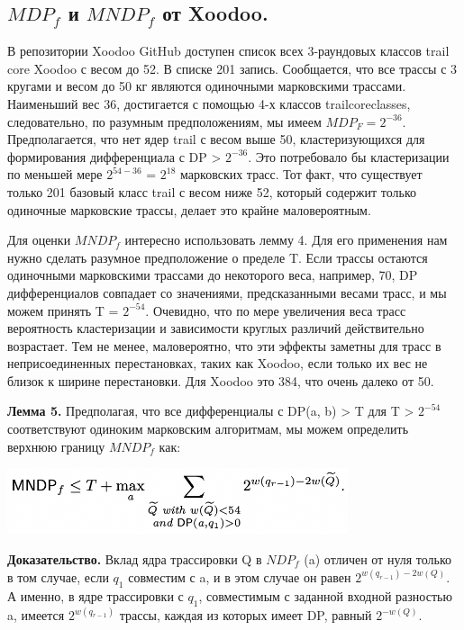 \documentclass[utf8,14pt,a4paper,oneside,russian]{book}
\begin{document}
\subsection{$MDP_f$ и $MNDP_f$ от Xoodoo.}

В репозитории Xoodoo GitHub доступен список всех 3-раундовых классов 
trail core Xoodoo с весом до 52. В списке 201 запись. Сообщается, что 
все трассы с 3 кругами и весом до 50 кг являются одиночными марковскими 
трассами. Наименьший вес 36, достигается с помощью 4-х классов 
trailcoreclasses, следовательно, по разумным предположениям, мы имеем 
$MDP_F =2^{-36}$. Предполагается, что нет ядер trail с весом выше 50, 
кластеризующихся для формирования дифференциала с DP > $2^{-36}$. 
Это потребовало бы кластеризации по меньшей мере $2^{54-36}$ = $2^18$ 
марковских трасс. Тот факт, что существует только 201 базовый класс 
trail с весом ниже 52, который содержит только одиночные марковские 
трассы, делает это крайне маловероятным.

Для оценки $MNDP_f$ интересно использовать лемму 4. Для его применения 
нам нужно сделать разумное предположение о пределе T. Если трассы остаются 
одиночными марковскими трассами до некоторого веса, например, 70, DP 
дифференциалов совпадает со значениями, предсказанными весами трасс, и мы 
можем принять T = $2^{-54}$. Очевидно, что по мере увеличения веса 
трасс вероятность кластеризации и зависимости круглых различий действительно 
возрастает. Тем не менее, маловероятно, что эти эффекты заметны для трасс 
в неприсоединенных перестановках, таких как Xoodoo, если только их вес не 
близок к ширине перестановки. Для Xoodoo это 384, что очень далеко от 50.

\newpage
\textbf{Лемма 5.} Предполагая, что все дифференциалы с DP(a, b) > T 
для T > $2^{-54}$ соответствуют одиноким марковским алгоритмам, мы 
можем определить верхнюю границу $MNDP_f$ как:

\includegraphics[width=10cm]{form26}

\textbf{Доказательство.} Вклад ядра трассировки Q в $NDP_f$ (a) отличен от нуля только 
в том случае, если $q_1$ совместим с a, и в этом случае он равен 
$2^{w(q_{r-1})-2w(Q)}$. А именно, в ядре трассировки с $q_1$, совместимым 
с заданной входной разностью a, имеется $2^{w (q_{r-1})}$ трассы, 
каждая из которых имеет DP, равный $2^{-w(Q)}$.
\end{document}
